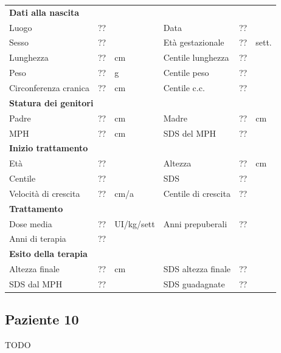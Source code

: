 \begin{table}[!h]
\begin{tabular}{lrllrl}
\toprule
\multicolumn{6}{l}{\textbf{Dati alla nascita}}\\
Luogo 		& \multicolumn{2}{l}{??} 	& Data 					& \multicolumn{2}{l}{??} 	\\
Sesso 		& \multicolumn{2}{l}{??} 	& Età gestazionale 		& ?? 		& sett.\\
Lunghezza 	& ?? 		& cm 				& Centile lunghezza		& ?? 		\\
Peso 		& ?? 		& g					& Centile peso			& ?? 		\\
Circonferenza cranica	& ?? 		& cm 	& Centile c.c.			& ?? \\
\midrule
\multicolumn{6}{l}{\textbf{Statura dei genitori}}\\
Padre 		& ?? & cm 	& Madre 				& ?? & cm \\
MPH 		& ?? & cm 	& SDS del MPH 			& ??\\
\midrule
\multicolumn{6}{l}{\textbf{Inizio trattamento}} \\
Età	& ?? & 		& Altezza 				& ?? & cm  \\
Centile & ?? 	 &		& SDS		& ?? \\
Velocità di crescita & ?? & cm/a	& Centile di crescita & ??\\
\midrule
\multicolumn{6}{l}{\textbf{Trattamento}} \\
Dose media		& ?? & UI/kg/sett & Anni prepuberali & ??\\
Anni di terapia & ??\\
\midrule
\multicolumn{6}{l}{\textbf{Esito della terapia}} \\
Altezza finale			& ?? & cm 	& SDS altezza finale		& ??\\
SDS dal MPH				& ?? &		& SDS guadagnate 			& ??\\
\bottomrule
\end{tabular}
\end{table}
\clearpage


\subsection*{Paziente 10}

TODO

